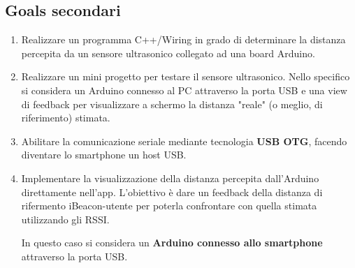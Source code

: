 \subsection{Goals secondari}
\begin{enumerate}	
	\item Realizzare un programma C++/Wiring in grado di determinare la distanza percepita da un sensore ultrasonico collegato ad una board Arduino.
	
	\item Realizzare un mini progetto per testare il sensore ultrasonico. Nello specifico si considera un Arduino connesso al PC attraverso la porta USB e una view di feedback per visualizzare a schermo la distanza "reale" (o meglio, di riferimento) stimata.
	
	\item Abilitare la comunicazione seriale mediante tecnologia \textbf{USB OTG}, facendo diventare lo smartphone un host USB.
	
	\item Implementare la visualizzazione della distanza percepita dall'Arduino direttamente nell'app. L'obiettivo è dare un feedback della distanza di rifermento iBeacon-utente per poterla confrontare con quella stimata utilizzando gli RSSI. 
	
	In questo caso si considera un \textbf{Arduino connesso allo smartphone} attraverso la porta USB.
\end{enumerate}



